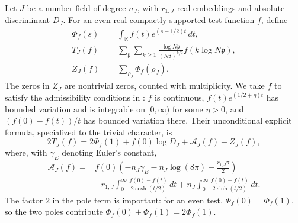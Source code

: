 \documentclass[11pt]{article}
\theoremstyle{definition}
\theoremstyle{remark}
\begin{document}
Let $J$ be a number field of degree $n_J$, with $r_{1,J}$ real
embeddings and absolute discriminant $D_J$.  For an even real compactly
supported test function $f$, define
\begin{align*}
 \Phi_f(s)&=\int_{\mathbb R}f(t)e^{(s-1/2)t}\,dt,\\
 T_J(f)&=\sum_{\mathfrak p}\sum_{k\geq1}
 \frac{\log N\mathfrak p}{(N\mathfrak p)^{k/2}}
 f(k\log N\mathfrak p),\\
 Z_J(f)&=\sum_{\rho_J}\Phi_f(\rho_J).
\end{align*}
The zeros in $Z_J$ are nontrivial zeros, counted with multiplicity.
We take $f$ to satisfy the admissibility conditions in
\citet[author pp.~4--5, equations~(3)--(4)]{BDF2008}:
$f$ is continuous, $f(t)e^{(1/2+\eta)t}$ has bounded variation
and is integrable on $[0,\infty)$ for some $\eta>0$, and
$(f(0)-f(t))/t$ has bounded variation there.  Their unconditional
explicit formula, specialized to the trivial character, is
\begin{equation}\label{eq:positive-test-explicit}
 2T_J(f)=2\Phi_f(1)+f(0)\log D_J+\mathcal A_J(f)-Z_J(f),
\end{equation}
where, with $\gamma_{\!E}$ denoting Euler's constant,
\begin{align*}
 \mathcal A_J(f)={}&
 f(0)\left(-n_J\gamma_{\!E}-n_J\log(8\pi)
                   -\frac{r_{1,J}\pi}{2}\right)\\
 &+r_{1,J}\int_0^\infty
       \frac{f(0)-f(t)}{2\cosh(t/2)}\,dt
  +n_J\int_0^\infty
       \frac{f(0)-f(t)}{2\sinh(t/2)}\,dt .
\end{align*}
The factor $2$ in the pole term is important: for an even test,
$\Phi_f(0)=\Phi_f(1)$, so the two poles contribute
$\Phi_f(0)+\Phi_f(1)=2\Phi_f(1)$.
\end{document}
